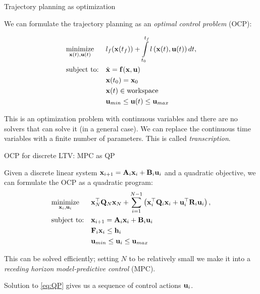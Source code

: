 \documentclass{beamer}
\begin{document}
\begin{frame}{Trajectory planning as optimization}
	\begin{flushleft}
		
		We can formulate the trajectory planning as an \emph{optimal control problem} (OCP):
		
		\begin{equation}
			\begin{aligned}
				& \underset{\mathbf{x}(t), \mathbf{u}(t)}{\text{minimize}}
				& & l_f(\mathbf{x}(t_f)) + \int\limits_{t_0}^{t_f} l \left( \mathbf{x}(t), \mathbf{u}(t) \right) dt, \\
				& \text{subject to:}
				& & \dot{\mathbf{x}} = 
				\mathbf{f}(\mathbf{x}, \mathbf{u}) \\
				& & & \mathbf{x}(t_0) = 
				\mathbf{x}_0 \\
				& & & \mathbf{x}(t) \in \text{workspace} \\
				& & & \mathbf{u}_{min} \leq \mathbf{u}(t) \leq \mathbf{u}_{max}
			\end{aligned}
		\end{equation}
		
		This is an optimization problem with continuous variables and there are no solvers that can solve it (in a general case). We can replace the continuous time variables with a finite number of parameters. This is called \emph{transcription}.
		
	\end{flushleft}
\end{frame}




\begin{frame}{OCP for discrete LTV: MPC as QP}
	\begin{flushleft}
		
		Given a discrete linear system $\mathbf{x}_{i+1} = \mathbf{A}_i \mathbf{x}_i + \mathbf{B}_i \mathbf{u}_i$ and a quadratic objective, we can formulate the OCP as a quadratic program:
		\begin{equation}
			\label{eq:QP}
			\begin{aligned}
				& \underset{\mathbf{x}_i, \mathbf{u}_i}{\text{minimize}}
				& & \mathbf{x}_N^\top \mathbf{Q}_N \mathbf{x}_N + \sum\limits_{i=1}^{N-1} \left( \mathbf{x}_i^\top \mathbf{Q}_i \mathbf{x}_i + \mathbf{u}_i^\top \mathbf{R}_i \mathbf{u}_i \right), \\
				& \text{subject to:}
				& & \mathbf{x}_{i+1} = \mathbf{A}_i \mathbf{x}_i + \mathbf{B}_i \mathbf{u}_i \\
				& & & \mathbf{F}_i \mathbf{x}_i \leq \mathbf{h}_i \\
				& & & \mathbf{u}_{min}  \leq \mathbf{u}_i \leq \mathbf{u}_{max}
			\end{aligned}
		\end{equation}
		
		This can be solved efficiently; setting $N$ to be relatively small we make it into a \emph{receding horizon} \emph{model-predictive control} (MPC). 
		
		Solution to \eqref{eq:QP} gives us a sequence of control actions $\mathbf{u}_i$.
		
	\end{flushleft}
\end{frame}
\end{document}
